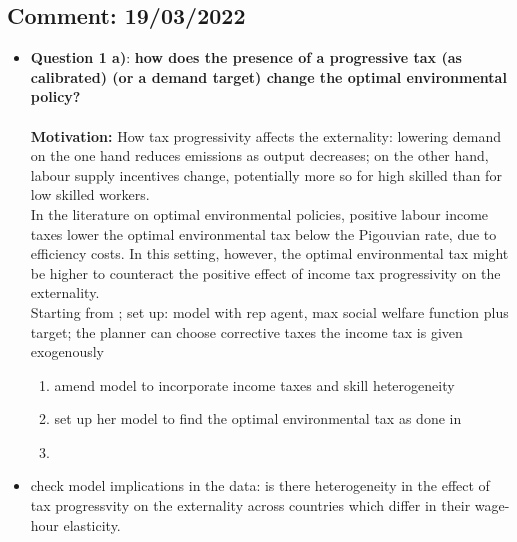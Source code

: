 \subsection*{Comment: 19/03/2022}
\begin{itemize}

	\item \textbf{Question 1 a)}: \textbf{how does the presence of a progressive tax (as calibrated) (or a demand target) change the optimal environmental policy?}\\ \ \\
\textbf{Motivation:} How tax progressivity affects the externality: lowering demand on the one hand reduces emissions as output decreases; on the other hand, labour supply incentives change, potentially more so for high skilled than for low skilled workers.\\
In the literature on optimal environmental policies, positive labour income taxes lower the optimal environmental tax below the Pigouvian rate, due to efficiency costs. In this setting, however, the optimal environmental tax might be higher to counteract the positive effect of income tax progressivity on the externality. \\
Starting from \cite{Fried2018ClimateAnalysis}; set up:  model with rep agent, max social welfare function plus target;  the planner can choose corrective taxes the income tax is given exogenously
\begin{enumerate}
	\item amend model to incorporate income taxes and skill heterogeneity
\item set up her model to find the optimal environmental tax as done in \cite{Barrage2019OptimalPolicy}
\item 
\end{enumerate}
\item[\ar] check model implications in the data: is there heterogeneity in the effect of tax progressvity on the externality across countries which differ in their wage-hour elasticity. 


\end{itemize}
